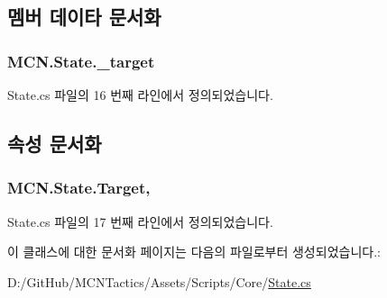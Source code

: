 \subsection{멤버 데이타 문서화}
\subsubsection[{\texorpdfstring{\+\_\+target}{_target}}]{ M\+C\+N.\+State.\+\_\+target\hspace{0.3cm}{\ttfamily [private]}}\hypertarget{class_m_c_n_1_1_state_a13fe398868da354cfde9ff644e12e9f2}{}\label{class_m_c_n_1_1_state_a13fe398868da354cfde9ff644e12e9f2}


State.\+cs 파일의 16 번째 라인에서 정의되었습니다.



\subsection{속성 문서화}
\subsubsection[{\texorpdfstring{Target}{Target}}]{ M\+C\+N.\+State.\+Target\hspace{0.3cm}{\ttfamily [get]}, {\ttfamily [protected]}}\hypertarget{class_m_c_n_1_1_state_a79a563b32f183c9adc9a96679fc57eb8}{}\label{class_m_c_n_1_1_state_a79a563b32f183c9adc9a96679fc57eb8}


State.\+cs 파일의 17 번째 라인에서 정의되었습니다.



이 클래스에 대한 문서화 페이지는 다음의 파일로부터 생성되었습니다.\+:\begin{DoxyCompactItemize}
\item 
D\+:/\+Git\+Hub/\+M\+C\+N\+Tactics/\+Assets/\+Scripts/\+Core/\hyperlink{_state_8cs}{State.\+cs}\end{DoxyCompactItemize}
